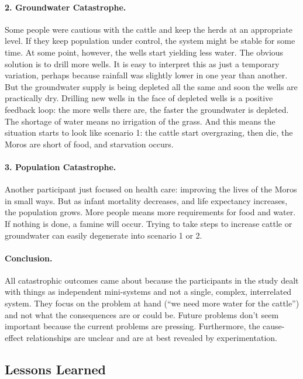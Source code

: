 \paragraph{2. Groundwater Catastrophe.}
Some people were cautious with the cattle and keep the herds at an appropriate level. If they keep population under control, the system might be stable for some time. At some point, however, the wells start yielding less water. The obvious solution is to drill more wells. It is easy to interpret this as just a temporary variation, perhaps because rainfall was slightly lower in one year than another. But the groundwater supply is being depleted all the same and soon the wells are practically dry. Drilling new wells in the face of depleted wells is a positive feedback loop: the more wells there are, the faster the groundwater is depleted. The shortage of water means no irrigation of the grass. And this means the situation starts to look like scenario 1: the cattle start overgrazing, then die, the Moros are short of food, and starvation occurs.

\paragraph{3. Population Catastrophe.}
Another participant just focused on health care: improving the lives of the Moros in small ways. But as infant mortality decreases, and life expectancy increases, the population grows. More people means more requirements for food and water. If nothing is done, a famine will occur. Trying to take steps to increase cattle or groundwater can easily degenerate into scenario 1 or 2.

\paragraph{Conclusion.}
All catastrophic outcomes came about because the participants in the study dealt with things as independent mini-systems and not a single, complex, interrelated system. They focus on the problem at hand (``we need more water for the cattle'') and not what the consequences are or could be. Future problems don't seem important because the current problems are pressing. Furthermore, the cause-effect relationships are unclear and are at best revealed by experimentation.

\subsection*{Lessons Learned}

